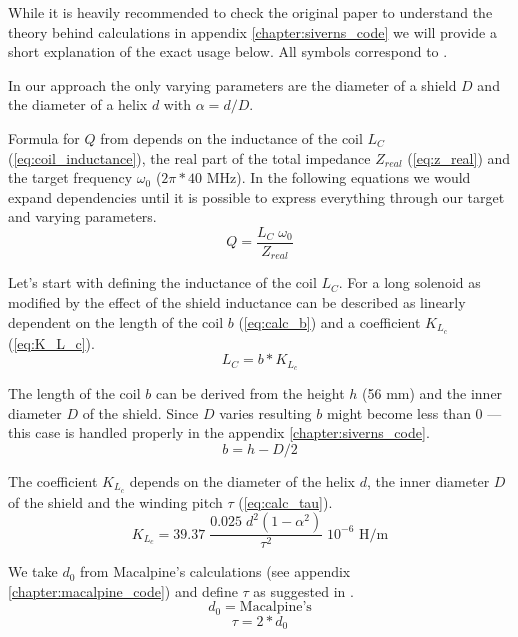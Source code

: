 While it is heavily recommended to check the original \cite{Siverns2012} paper to understand the theory behind calculations in appendix \ref{chapter:siverns_code} we will provide a short explanation of the exact usage below. All symbols correspond to \cite{Siverns2012}.

In our approach the only varying parameters are the diameter of a shield $D$ and the diameter of a helix $d$ with $\alpha = d / D$.

Formula for $Q$ from \cite{Siverns2012} depends on the inductance of the coil $L_C$ (\ref{eq:coil_inductance}), the real part of the total impedance $Z_{real}$ (\ref{eq:z_real}) and the target frequency $\omega_0$ ($2\pi * 40$ MHz). In the following equations we would expand dependencies until it is possible to express everything through our target and varying parameters.
\begin{equation}
	Q = \frac{L_C \; \omega_0}{Z_{real}}
	\label{eq:calc_q}
\end{equation}

Let's start with defining the inductance of the coil $L_C$. For a long solenoid as modified by the effect of the shield \cite{Macalpine2000} inductance can be described as linearly dependent on the length of the coil $b$ (\ref{eq:calc_b}) and a coefficient $K_{L_c}$ (\ref{eq:K_L_c}).
\begin{equation}
	L_C = b* K_{L_c}
	\label{eq:coil_inductance}
\end{equation}

The length of the coil $b$ can be derived \cite{Macalpine2000} from the height $h$ (56 mm) and the inner diameter $D$ of the shield. Since $D$ varies resulting $b$ might become less than 0 --- this case is handled properly in the appendix \ref{chapter:siverns_code}.
\begin{equation}
	b = h - D/2
	\label{eq:calc_b}
\end{equation}

The coefficient $K_{L_c}$ depends on the diameter of the helix $d$, the inner diameter $D$ of the shield and the winding pitch $\tau$ (\ref{eq:calc_tau}).
\begin{equation}
	K_{L_c} = 39.37 \; \frac{0.025 \; d^2 \left(1 - \alpha^2 \right)}{\tau^2} \; 10^{-6} \text{ H/m}
	\label{eq:K_L_c}
\end{equation}

We take $d_0$ from Macalpine's calculations (see appendix \ref{chapter:macalpine_code}) and define $\tau$ as suggested in \cite{Macalpine2000}.
\begin{equation}
	d_0 = \text{Macalpine's}
\end{equation}
\begin{equation}
	\tau = 2*d_0
	\label{eq:calc_tau}
\end{equation}

